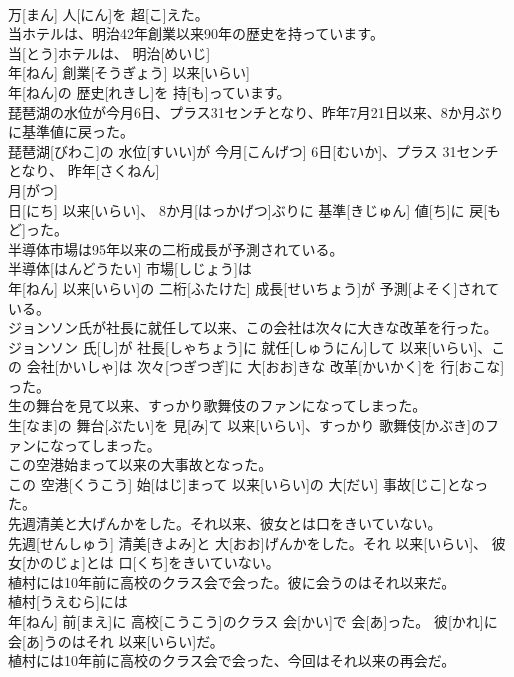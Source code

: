 \documentclass[8pt]{extreport}
\begin{document}
\begin{CJK}{UTF8}{min}
\\	万[まん] 人[にん]を 超[こ]えた。
\\	当ホテルは、明治42年創業以来90年の歴史を持っています。	
\\	当[とう]ホテルは、 明治[めいじ] 
\\	年[ねん] 創業[そうぎょう] 以来[いらい] 
\\	年[ねん]の 歴史[れきし]を 持[も]っています。
\\	琵琶湖の水位が今月6日、プラス31センチとなり、昨年7月21日以来、8か月ぶりに基準値に戻った。	
\\	琵琶湖[びわこ]の 水位[すいい]が 今月[こんげつ] 6日[むいか]、プラス 31センチとなり、 昨年[さくねん] 
\\	月[がつ] 
\\	日[にち] 以来[いらい]、 8か月[はっかげつ]ぶりに 基準[きじゅん] 値[ち]に 戻[もど]った。
\\	半導体市場は95年以来の二桁成長が予測されている。	
\\	半導体[はんどうたい] 市場[しじょう]は 
\\	年[ねん] 以来[いらい]の 二桁[ふたけた] 成長[せいちょう]が 予測[よそく]されている。
\\	ジョンソン氏が社長に就任して以来、この会社は次々に大きな改革を行った。	
\\	ジョンソン 氏[し]が 社長[しゃちょう]に 就任[しゅうにん]して 以来[いらい]、この 会社[かいしゃ]は 次々[つぎつぎ]に 大[おお]きな 改革[かいかく]を 行[おこな]った。
\\	生の舞台を見て以来、すっかり歌舞伎のファンになってしまった。	
\\	生[なま]の 舞台[ぶたい]を 見[み]て 以来[いらい]、すっかり 歌舞伎[かぶき]のファンになってしまった。
\\	この空港始まって以来の大事故となった。	
\\	この 空港[くうこう] 始[はじ]まって 以来[いらい]の 大[だい] 事故[じこ]となった。
\\	先週清美と大げんかをした。それ以来、彼女とは口をきいていない。	
\\	先週[せんしゅう] 清美[きよみ]と 大[おお]げんかをした。それ 以来[いらい]、 彼女[かのじょ]とは 口[くち]をきいていない。
\\	植村には10年前に高校のクラス会で会った。彼に会うのはそれ以来だ。	
\\	植村[うえむら]には 
\\	年[ねん] 前[まえ]に 高校[こうこう]のクラス 会[かい]で 会[あ]った。 彼[かれ]に 会[あ]うのはそれ 以来[いらい]だ。
\\	植村には10年前に高校のクラス会で会った、今回はそれ以来の再会だ。	

\end{CJK}
\end{document}
